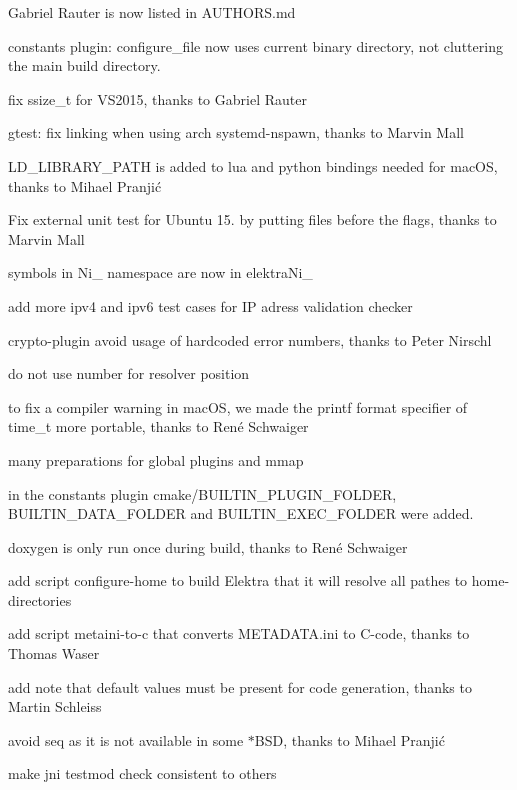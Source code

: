\begin{DoxyItemize}
\item Gabriel Rauter is now listed in A\+U\+T\+H\+O\+RS.md
\item constants plugin\+: configure\+\_\+file now uses current binary directory, not cluttering the main build directory.
\item fix ssize\+\_\+t for V\+S2015, thanks to Gabriel Rauter
\item gtest\+: fix linking when using arch systemd-\/nspawn, thanks to Marvin Mall
\item {\ttfamily L\+D\+\_\+\+L\+I\+B\+R\+A\+R\+Y\+\_\+\+P\+A\+TH} is added to lua and python bindings needed for mac\+OS, thanks to Mihael Pranjić
\item Fix external unit test for Ubuntu 15. by putting files before the flags, thanks to Marvin Mall
\item symbols in {\ttfamily Ni\+\_\+} namespace are now in {\ttfamily elektra\+Ni\+\_\+}
\item add more ipv4 and ipv6 test cases for IP adress validation checker
\item crypto-\/plugin avoid usage of hardcoded error numbers, thanks to Peter Nirschl
\item do not use number for resolver position
\item to fix a compiler warning in mac\+OS, we made the printf format specifier of time\+\_\+t more portable, thanks to René Schwaiger
\item many preparations for global plugins and mmap
\item in the constants plugin {\ttfamily cmake/\+B\+U\+I\+L\+T\+I\+N\+\_\+\+P\+L\+U\+G\+I\+N\+\_\+\+F\+O\+L\+D\+ER}, {\ttfamily B\+U\+I\+L\+T\+I\+N\+\_\+\+D\+A\+T\+A\+\_\+\+F\+O\+L\+D\+ER} and {\ttfamily B\+U\+I\+L\+T\+I\+N\+\_\+\+E\+X\+E\+C\+\_\+\+F\+O\+L\+D\+ER} were added.
\item doxygen is only run once during build, thanks to René Schwaiger
\item add script configure-\/home to build Elektra that it will resolve all pathes to home-\/directories
\item add script metaini-\/to-\/c that converts M\+E\+T\+A\+D\+A\+T\+A.\+ini to C-\/code, thanks to Thomas Waser
\item add note that default values must be present for code generation, thanks to Martin Schleiss
\item avoid {\ttfamily seq} as it is not available in some {\ttfamily $\ast$\+B\+SD}, thanks to Mihael Pranjić
\item make jni testmod check consistent to others
\end{DoxyItemize}

